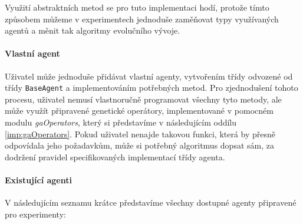 Využití abstraktních metod se pro tuto implementaci hodí, protože tímto
způsobem můžeme v experimentech jednoduše zaměňovat typy využívaných
agentů a měnit tak algoritmy evolučního vývoje. 

\paragraph{Vlastní agent}
Uživatel může jednoduše přidávat vlastní agenty, vytvořením třídy odvozené
od třídy \texttt{BaseAgent} a implementováním potřebných metod. Pro
zjednodušení tohoto procesu, uživatel nemusí vlastnoručně programovat všechny
tyto metody, ale může využít připravené genetické operátory, implementované v
pomocném modulu \emph{gaOperators}, který si představíme v následujícím oddílu
\ref{imp:gaOperators}. Pokud uživatel nenajde takovou funkci, která by přesně
odpovídala jeho požadavkům, může si potřebný algoritmus dopsat sám, za dodržení
pravidel specifikovaných implementací třídy agenta.

\paragraph{Existující agenti}
V následujícím seznamu krátce představíme všechny dostupné agenty připravené
pro experimenty:

